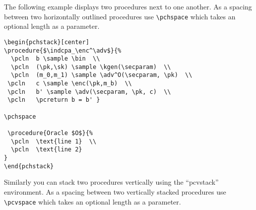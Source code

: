 \documentclass[a4paper]{report}
\begin{document}
The following example displays two procedures next to one another. As a spacing between two horizontally outlined procedures
use \lstinline{\pchspace} which takes an optional length as a parameter.

\begin{pchstack}[center]

\pchspace

\end{pchstack}

\begin{lstlisting}
\begin{pchstack}[center]
\procedure{$\indcpa_\enc^\adv$}{%
  \pcln  b \sample \bin  \\
  \pcln  (\pk,\sk) \sample \kgen(\secparam)  \\
  \pcln  (m_0,m_1) \sample \adv^O(\secparam, \pk)  \\
 \pcln   c \sample \enc(\pk,m_b)  \\
 \pcln   b' \sample \adv(\secparam, \pk, c)  \\
 \pcln   \pcreturn b = b' }

\pchspace

 \procedure{Oracle $O$}{%
  \pcln  \text{line 1}  \\
  \pcln  \text{line 2}
}
\end{pchstack}
\end{lstlisting}


Similarly you can stack two procedures vertically using the \enquote{pcvstack} environment. As a spacing between two vertically stacked procedures
use \lstinline{\pcvspace} which takes an optional length as a parameter.


\begin{pcvstack}[center]

\pcvspace

\end{pcvstack}
\end{document}
